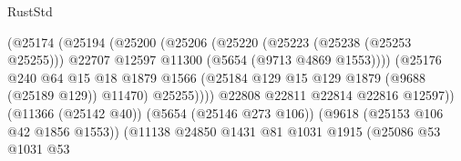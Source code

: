 \begin{lexlean}{RustStd}
\begin{coremodule}
                                                (@25174
                                                  (@25194
                                                    (@25200
                                                      (@25206
                                                        (@25220
                                                          (@25223 (@25238 (@25253 @25255)))
                                                          @22707
                                                          @12597
                                                          @11300
                                                          (@5654 (@9713 @4869 @1553))))
                                                      (@25176
                                                        @240
                                                        @64
                                                        @15
                                                        @18
                                                        @1879
                                                        @1566
                                                        (@25184
                                                          @129
                                                          @15
                                                          @129
                                                          @1879
                                                          (@9688 (@25189 @129))
                                                          @11470)
                                                        @25255))))
                                                @22808
                                                @22811
                                                @22814
                                                @22816
                                                @12597))
                                            (@11366 (@25142 @40))
                                            (@5654 (@25146 @273 @106))
                                            (@9618 (@25153 @106 @42 @1856 @1553))
                                            (@11138
                                              @24850
                                              @1431
                                              @81
                                              @1031
                                              @1915
                                              (@25086
                                                @53
                                                @1031
                                                @53

\end{coremodule}
\end{lexlean}
